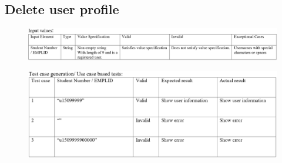 \documentclass[english]{article}
\begin{document}
\subsection{Delete user profile}
\begin{figure}[ht!]
\hspace*{-2.5cm}
\includegraphics[width=180mm]{12.png}
\end{figure}
\begin{figure}[ht!]
\hspace*{-2.5cm}
\includegraphics[width=180mm]{ViewTestCase.png}
\end{figure}
\clearpage
\end{document}
